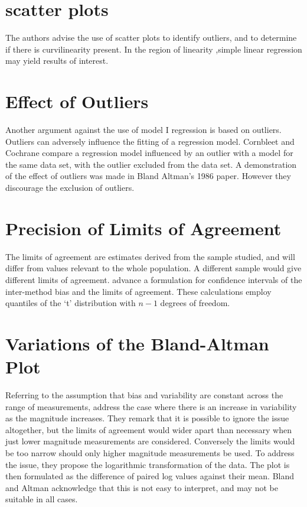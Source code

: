 \documentclass[12pt, a4paper]{report}
\theoremstyle{plain}
\theoremstyle{definition}
\theoremstyle{remark}
\begin{document}
	\section{scatter plots} The authors advise the
	use of scatter plots to identify outliers, and to determine if
	there is curvilinearity present. In the region of linearity
	,simple linear regression may yield results of interest.
	
	\section{Effect of Outliers} Another argument against
	the use of model I regression is based on outliers. Outliers can
	adversely influence the fitting of a regression model. Cornbleet
	and Cochrane compare a regression model influenced by an outlier
	with a model for the same data set, with the outlier excluded from
	the data set. A demonstration of the effect of outliers was made
	in Bland Altman's 1986 paper. However they discourage the
	exclusion of outliers.
	

	\section{Precision of Limits of Agreement}
	The limits of agreement are estimates derived from the sample
	studied, and will differ from values relevant to the whole
	population. A different sample would give different limits of
	agreement. \citet*{BA86} advance a formulation for confidence
	intervals of the inter-method bias and the limits of agreement.
	These calculations employ quantiles of the `t' distribution with
	$n -1$ degrees of freedom.
	

	\section{Variations of the Bland-Altman Plot} Referring to the
	assumption that bias and variability are constant across the range
	of measurements, \citet{BA99} address the case where there is an
	increase in variability as the magnitude increases. They remark
	that it is possible to ignore the issue altogether, but the limits
	of agreement would wider apart than necessary when just lower
	magnitude measurements are considered. Conversely the limits would
	be too narrow should only higher magnitude measurements be used.
	To address the issue, they propose the logarithmic transformation
	of the data. The plot is then formulated as the difference of
	paired log values against their mean. Bland and Altman acknowledge
	that this is not easy to interpret, and may not be suitable in
	all cases.
	
\end{document}
